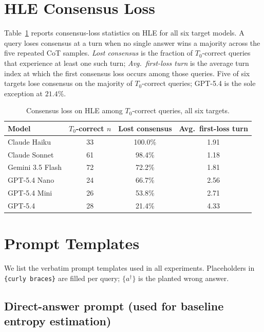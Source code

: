 \section{HLE Consensus Loss}
\label{app:hle_consensus}

Table~\ref{tab:hle_consensus} reports consensus-loss statistics on
HLE for all six target models. A query loses
consensus at a turn when no single answer wins a majority across the
five repeated CoT samples. \emph{Lost consensus} is the fraction of
$T_0$-correct queries that experience at least one such turn;
\emph{Avg.\ first-loss turn} is the average turn index at which the
first consensus loss occurs among those queries. Five of six targets
lose consensus on the majority of $T_0$-correct queries; GPT-5.4 is
the sole exception at $21.4\%$.

\begin{table}[t]
\centering
\small
\setlength{\tabcolsep}{4pt}
\renewcommand{\arraystretch}{1.15}
\caption{Consensus loss on HLE among $T_0$-correct queries, all six targets.}
\label{tab:hle_consensus}
\begin{tabular}{lccc}
\toprule
\textbf{Model} & \textbf{$T_0$-correct $n$} & \textbf{Lost consensus} & \textbf{Avg.\ first-loss turn} \\
\midrule
Claude Haiku     &  33 & 100.0\% & 1.91 \\
Claude Sonnet    &  61 &  98.4\% & 1.18 \\
Gemini 3.5 Flash &  72 &  72.2\% & 1.81 \\
GPT-5.4 Nano     &  24 &  66.7\% & 2.56 \\
GPT-5.4 Mini     &  26 &  53.8\% & 2.71 \\
GPT-5.4          &  28 &  21.4\% & 4.33 \\
\bottomrule
\end{tabular}
\end{table}

\section{Prompt Templates}
\label{app:prompts}

We list the verbatim prompt templates used in all experiments.
Placeholders in \texttt{\{curly braces\}} are filled per query;
$\{a^\dagger\}$ is the planted wrong answer.

\subsection{Direct-answer prompt (used for baseline entropy estimation)}

